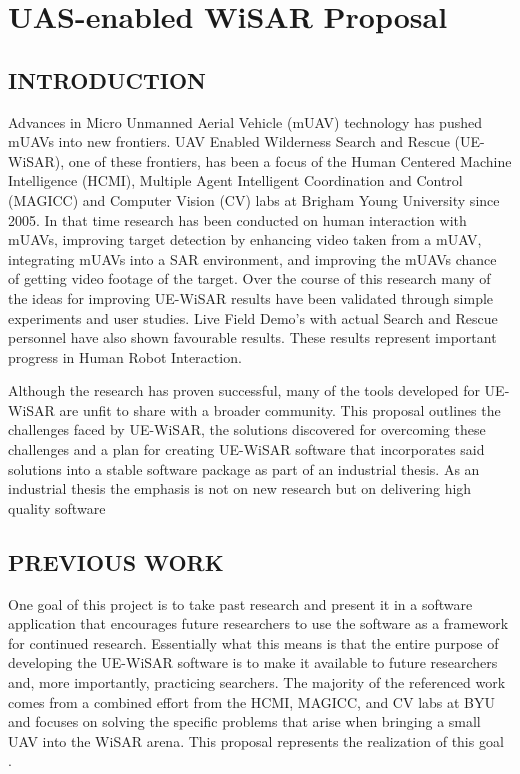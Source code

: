 \chapter{UAS-enabled WiSAR Proposal} \label{app:uas_wisar}

\section{INTRODUCTION}
Advances in Micro Unmanned Aerial Vehicle (mUAV) technology has pushed mUAVs
into new frontiers.  UAV Enabled Wilderness Search and
Rescue (UE-WiSAR), one of these frontiers, has been a focus of the Human
Centered Machine Intelligence (HCMI), Multiple Agent Intelligent Coordination and Control (MAGICC) and Computer Vision (CV) labs at Brigham Young University since 2005.  In that time research has
been conducted on human interaction with mUAVs, improving target detection by
enhancing video taken from a mUAV, integrating mUAVs into a SAR environment,
and improving the mUAVs chance of getting video footage of the target.  Over
the course of this research many of the ideas for improving UE-WiSAR results
have been validated through simple experiments and user studies.  Live Field
Demo's with actual Search and Rescue personnel have also shown favourable
results. These results represent important progress in Human Robot Interaction. 

Although the research has proven successful, many of the tools developed for
UE-WiSAR are unfit to share with a broader community.  This proposal outlines
the challenges faced by UE-WiSAR, the solutions discovered for overcoming these
challenges and a plan for creating UE-WiSAR software that incorporates said
solutions into a stable software package as part of an industrial thesis.  As an
industrial thesis the emphasis is not on new research but on delivering high
quality software

\section{PREVIOUS WORK}
One goal of this project is to take past research and present it in a software
application that encourages future researchers to use the software as a
framework for continued research.  Essentially what this means is that the
entire purpose of developing the UE-WiSAR software is to make it available
to future researchers and, more importantly, practicing searchers.  The majority
of the referenced work comes from a combined effort from the HCMI, MAGICC, and CV labs at BYU and focuses on solving
the specific problems that arise when bringing a small UAV into the WiSAR arena.
This proposal represents the realization of this goal
\cite{lin2010supporting}.
  
